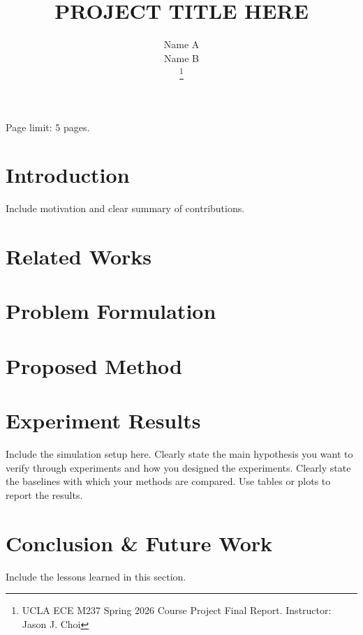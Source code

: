 \documentclass[letterpaper, 10 pt, conference]{ieeeconf}  %
\title{\LARGE \bf
PROJECT TITLE HERE}
\author{ \parbox{3 in}{\centering Name A}
        \hspace*{ 0.1 in}
        \parbox{2.5 in}{ \centering Name B}
\thanks{UCLA ECE M237 Spring 2026 Course Project Final Report. Instructor: Jason J. Choi}
}
\begin{document}
\maketitle

\noindent Page limit: 5 pages.

\section{Introduction}

Include motivation and clear summary of contributions.

\section{Related Works}

\section{Problem Formulation}

\section{Proposed Method}

\section{Experiment Results}

Include the simulation setup here. Clearly state the main hypothesis you want to verify through experiments and how you designed the experiments. Clearly state the baselines with which your methods are compared. Use tables or plots to report the results.

\section{Conclusion \& Future Work}

Include the lessons learned in this section.


\end{document}
